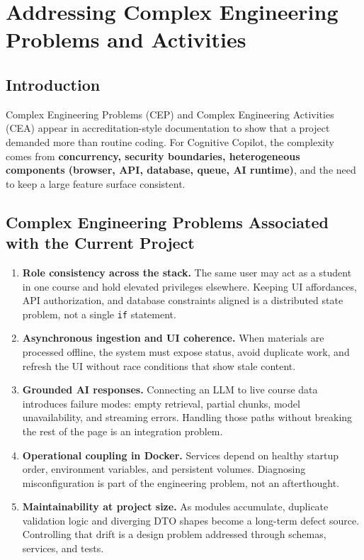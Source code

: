 \chapter{Addressing Complex Engineering Problems and Activities}

\section{Introduction}
Complex Engineering Problems (CEP) and Complex Engineering Activities (CEA) appear in accreditation-style documentation to show that a project demanded more than routine coding. For Cognitive Copilot, the complexity comes from \textbf{concurrency, security boundaries, heterogeneous components (browser, API, database, queue, AI runtime)}, and the need to keep a large feature surface consistent.

\section{Complex Engineering Problems Associated with the Current Project}
\begin{enumerate}[label=\arabic*.]
\item \textbf{Role consistency across the stack.} The same user may act as a student in one course and hold elevated privileges elsewhere. Keeping UI affordances, API authorization, and database constraints aligned is a distributed state problem, not a single \texttt{if} statement.

\item \textbf{Asynchronous ingestion and UI coherence.} When materials are processed offline, the system must expose status, avoid duplicate work, and refresh the UI without race conditions that show stale content.

\item \textbf{Grounded AI responses.} Connecting an LLM to live course data introduces failure modes: empty retrieval, partial chunks, model unavailability, and streaming errors. Handling those paths without breaking the rest of the page is an integration problem.

\item \textbf{Operational coupling in Docker.} Services depend on healthy startup order, environment variables, and persistent volumes. Diagnosing misconfiguration is part of the engineering problem, not an afterthought.

\item \textbf{Maintainability at project size.} As modules accumulate, duplicate validation logic and diverging DTO shapes become a long-term defect source. Controlling that drift is a design problem addressed through schemas, services, and tests.
\end{enumerate}

